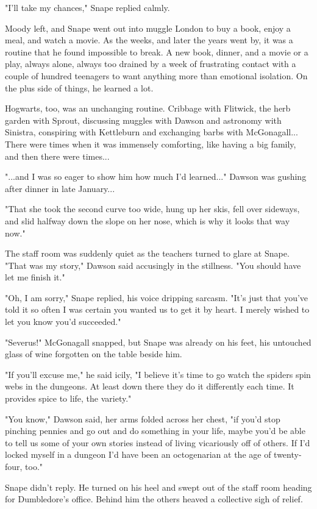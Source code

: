 \documentclass[a4paper,11pt]{article}
\begin{document}
"I'll take my chances," Snape replied calmly.

Moody left, and Snape went out into muggle London to buy a book, enjoy a meal, and watch a movie. As the weeks, and later the years went by, it was a routine that he found impossible to break. A new book, dinner, and a movie or a play, always alone, always too drained by a week of frustrating contact with a couple of hundred teenagers to want anything more than emotional isolation. On the plus side of things, he learned a lot.

Hogwarts, too, was an unchanging routine. Cribbage with Flitwick, the herb garden with Sprout, discussing muggles with Dawson and astronomy with Sinistra, conspiring with Kettleburn and exchanging barbs with McGonagall... There were times when it was immensely comforting, like having a big family, and then there were times...

"...and I was so eager to show him how much I'd learned..." Dawson was gushing after dinner in late January...

"That she took the second curve too wide, hung up her skis, fell over sideways, and slid halfway down the slope on her nose, which is why it looks that way now."

The staff room was suddenly quiet as the teachers turned to glare at Snape. "That was my story," Dawson said accusingly in the stillness. "You should have let me finish it."

"Oh, I am sorry," Snape replied, his voice dripping sarcasm. "It's just that you've told it so often I was certain you wanted us to get it by heart. I merely wished to let you know you'd succeeded."

"Severus!" McGonagall snapped, but Snape was already on his feet, his untouched glass of wine forgotten on the table beside him.

"If you'll excuse me," he said icily, "I believe it's time to go watch the spiders spin webs in the dungeons. At least down there they do it differently each time. It provides spice to life, the variety."

"You know," Dawson said, her arms folded across her chest, "if you'd stop pinching pennies and go out and do something in your life, maybe you'd be able to tell us some of your own stories instead of living vicariously off of others. If I'd locked myself in a dungeon I'd have been an octogenarian at the age of twenty-four, too."

Snape didn't reply. He turned on his heel and swept out of the staff room heading for Dumbledore's office. Behind him the others heaved a collective sigh of relief.
\end{document}
